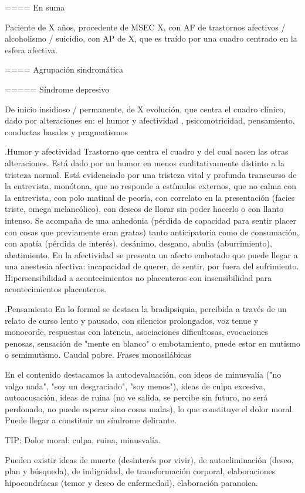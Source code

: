 \documentclass[encares.tex]{subfiles}
\begin{document}
==== En suma

Paciente de X años, procedente de MSEC X, con AF de trastornos afectivos / alcoholismo / suicidio, con AP de X, que es traído por una cuadro centrado en la esfera afectiva.

==== Agrupación sindromática

===== Síndrome depresivo

De inicio insidioso / permanente, de X evolución, que centra el cuadro clínico, dado por alteraciones en: el humor y afectividad , psicomotricidad, pensamiento, conductas basales y pragmatismos

.Humor y afectividad
Trastorno que centra el cuadro y del cual nacen las otras alteraciones. Está dado por un humor en menos cualitativamente distinto a la tristeza normal. Está evidenciado por una tristeza vital y profunda transcurso de la entrevista, monótona, que no responde a estímulos externos, que no calma con la entrevista, con polo matinal de peoría, con correlato en la presentación (facies triste, omega melancólico), con deseos de llorar sin poder hacerlo o con llanto intenso. Se acompaña de una anhedonia (pérdida de capacidad para sentir placer con cosas que previamente eran gratas) tanto anticipatoria como de consumación, con apatía (pérdida de interés), desánimo, desgano, abulia (aburrimiento), abatimiento. En la afectividad se presenta un afecto embotado que puede llegar a una anestesia afectiva: incapacidad de querer, de sentir, por fuera del sufrimiento. Hipersensibilidad a acontecimientos no placenteros con insensibilidad para acontecimientos placenteros.

.Pensamiento
En lo formal se destaca la bradipsiquia, percibida a través de un relato de curso lento y pausado, con silencios prolongados, voz tenue y monocorde, respuestas con latencia, asociaciones dificultosas, evocaciones penosas, sensación de "mente en blanco" o embotamiento, puede estar en mutismo o semimutismo. Caudal pobre. Frases monosilábicas

En el contenido destacamos la autodevaluación, con ideas de minusvalía ("no valgo nada", "soy un desgraciado", "soy menos"), ideas de culpa excesiva, autoacusación, ideas de ruina (no ve salida, se percibe sin futuro, no será perdonado, no puede esperar sino cosas malas), lo que constituye el dolor moral. Puede llegar a constituir un síndrome delirante.

TIP: Dolor moral: culpa, ruina, minusvalía.

Pueden existir ideas de muerte (desinterés por vivir), de autoeliminación (deseo, plan y búsqueda), de indignidad, de transformación corporal, elaboraciones hipocondríacas (temor y deseo de enfermedad), elaboración paranoica.
\end{document}
